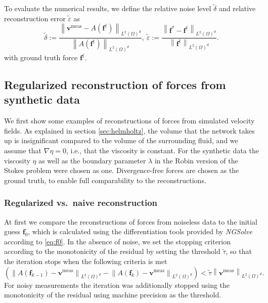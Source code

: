 \documentclass[final,leqno]{scrarticle}
\newcommand{\norm}[1]{\left\| #1 \right\|}
\newcommand{\lzd}{{L^2(\Omega)^d}}
\newcommand{\tc}[1]{\begin{quotation}\textbf{Tram's comment:\
}{\textit{#1}}\end{quotation}}
\begin{document}

To evaluate the numerical results, we define the relative noise level $\tilde{\delta}$ and relative reconstruction error $\tilde{\varepsilon}$ as
\begin{displaymath}
    \tilde{\delta} :=\frac{\norm{\mathbf{v}^{\operatorname{meas}}-A(\mathbf{f}^\dagger)}_\lzd }{\norm{A(\mathbf{f}^\dagger)}_{\lzd}}, \ 
    \tilde{\varepsilon} :=\frac{\norm{\mathbf{f}^*-\mathbf{f}^{\dagger}}_\lzd }{\norm{\mathbf{f}^\dagger}_{\lzd}} .
\end{displaymath}
with ground truth force $\mathbf{f}^\dagger$.

\subsection{Regularized reconstruction of forces from synthetic data\label{sec:num_syntetic}}

We first show some examples of reconstructions of forces from simulated velocity fields.
As explained in section \ref{sec:helmholtz}, the volume that the network takes up is insignificant compared to the volume of the surrounding fluid, and we assume that $\nabla \eta = 0$, i.e., that the viscosity is constant.
For the synthetic data the viscosity $\eta$ as well as the boundary parameter $\lambda$ in the Robin version of the Stokes problem were chosen as one. Divergence-free forces are chosen as the ground truth, to enable full comparability to the reconstructions.


\subsubsection{Regularized vs.~naive reconstruction}

At first we compare the reconstructions of forces from noiseless data to the initial guess $\mathbf{f}_0$, which is calculated using the differentiation tools provided by \textit{NGSolve} according to \eqref{eq:f0}. In the absence of noise, we set the stopping criterion according to the monotonicity of the residual by setting the threshold $\tilde{\tau}$, so that the iteration stops when the following criteria is met
\begin{displaymath}
   \left(\norm{A(\mathbf{f}_{k-1})-\mathbf{v}^{\operatorname{meas}}}_\lzd - \norm{A(\mathbf{f}_{k})-\mathbf{v}^{\operatorname{meas}}} _\lzd\right) < \tilde{\tau} \norm{\mathbf{v}^{\operatorname{meas}}}_\lzd. 
\end{displaymath}
For noisy measurements the iteration was additionally stopped using the monotonicity of the residual using machine precision as the threshold.
\end{document}
